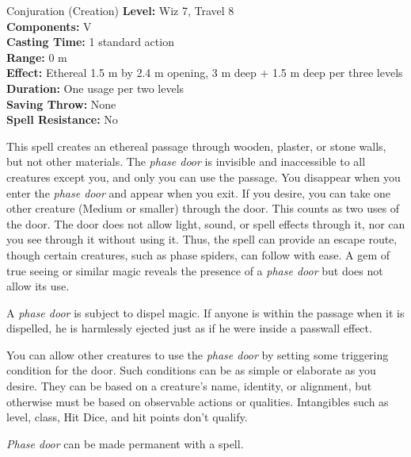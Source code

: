 {Conjuration (Creation)}
{
	\textbf{Level:}
	Wiz 7, Travel 8\\
	\textbf{Components:}
	V\\
	\textbf{Casting Time:}
	1 standard action\\
	\textbf{Range:}
	0 m\\
	\textbf{Effect:}
	Ethereal 1.5 m by 2.4 m opening, 3 m deep + 1.5 m deep per three levels\\
	\textbf{Duration:}
	One usage per two levels\\
	\textbf{Saving Throw:}
	None\\
	\textbf{Spell Resistance:}
	No\\
}
{
	This spell creates an ethereal passage through wooden, plaster, or stone walls, but not other materials. The \emph{phase door} is invisible and inaccessible to all creatures except you, and only you can use the passage. You disappear when you enter the \emph{phase door} and appear when you exit. If you desire, you can take one other creature (Medium or smaller) through the door. This counts as two uses of the door. The door does not allow light, sound, or spell effects through it, nor can you see through it without using it. Thus, the spell can provide an escape route, though certain creatures, such as phase spiders, can follow with ease. A gem of true seeing or similar magic reveals the presence of a \emph{phase door} but does not allow its use.

	A \emph{phase door} is subject to dispel magic. If anyone is within the passage when it is dispelled, he is harmlessly ejected just as if he were inside a passwall effect.

	You can allow other creatures to use the \emph{phase door} by setting some triggering condition for the door. Such conditions can be as simple or elaborate as you desire. They can be based on a creature's name, identity, or alignment, but otherwise must be based on observable actions or qualities. Intangibles such as level, class, Hit Dice, and hit points don't qualify.

	\emph{Phase door} can be made permanent with a  spell.

}
